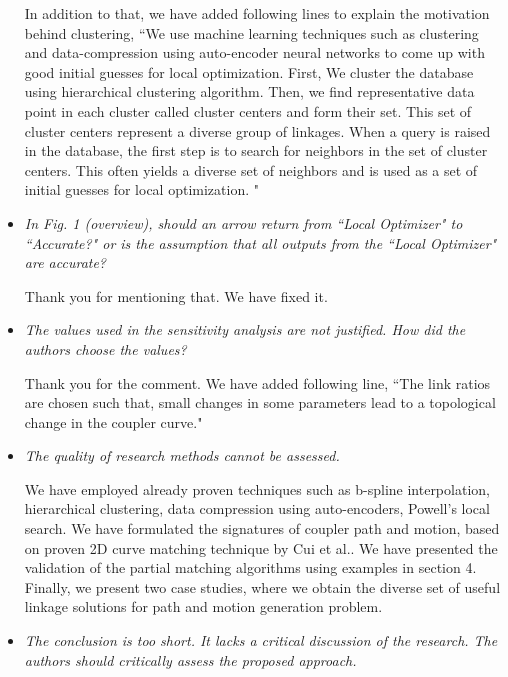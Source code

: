 \documentclass{article}
\begin{document}
\begin{itemize}
In addition to that, we have added following lines to explain the motivation behind clustering,
``We use machine learning techniques such as clustering and data-compression using auto-encoder neural networks to come up with good initial guesses for local optimization.
First, We cluster the database using hierarchical clustering algorithm.
Then, we find representative data point in each cluster called cluster centers and form their set.
This set of cluster centers represent a diverse group of linkages.
When a query is raised in the database, the first step is to search for neighbors in the set of cluster centers.
This often yields a diverse set of neighbors and is used as a set of initial guesses for local optimization.
"
\\

  \item \emph{
  In Fig. 1 (overview), should an arrow return from ``Local Optimizer" to ``Accurate?" or is the assumption that all outputs from the ``Local Optimizer" are accurate?
}

Thank you for mentioning that.
We have fixed it.
\\

  \item \emph{
The values used in the sensitivity analysis are not justified. How did the authors choose the values?
}

Thank you for the comment. We have added following line,
``The link ratios are chosen such that, small changes in some parameters lead to a topological change in the coupler curve."
\\

  \item \emph{
The quality of research methods cannot be assessed.
}

We have employed already proven techniques such as b-spline interpolation, hierarchical clustering, data compression using auto-encoders, Powell's local search.
We have formulated the signatures of coupler path and motion, based on proven 2D curve matching technique by Cui et al.\cite{cui2009}.
We have presented the validation of the partial matching algorithms using examples in section 4.
Finally, we present two case studies, where we obtain the diverse set of useful linkage solutions for path and motion generation problem.
\\

  \item \emph{
The conclusion is too short. It lacks a critical discussion of the research. The authors should critically assess the proposed approach.
}


\end{itemize}
\end{document}
